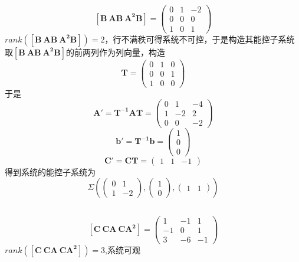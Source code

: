 \documentclass[UTF8,a4paper]{ctexart}
\begin{document}
\subsection{}
$$\mathbf{[B \ AB \ A^2B]}=\begin{pmatrix}
0&1&-2\\
0&0&0\\
1&0&1
\end{pmatrix}$$
$rank(\mathbf{[B\  AB\  A^2B]})=2$，行不满秩可得系统不可控，于是构造其能控子系统
取$\mathbf{[B \ AB \ A^2B]}$的前两列作为列向量，构造$$\mathbf{T}=\begin{pmatrix}
0&1&0\\
0&0&1\\
1&0&0\end{pmatrix}$$
于是$$\mathbf{A'=T^{-1}AT}=\begin{pmatrix}
0&1&-4\\
1&-2&2\\
0&0&-2\end{pmatrix}$$
$$\mathbf{b'=T^{-1}b}=\begin{pmatrix}1\\0\\0\end{pmatrix}$$
$$\mathbf{C'=CT}=\begin{pmatrix}1&1&-1\end{pmatrix}$$
得到系统的能控子系统为
$$\Sigma(\begin{pmatrix}
0&1\\
1&-2\end{pmatrix},
\begin{pmatrix}1\\0\end{pmatrix},
\begin{pmatrix}1&1\end{pmatrix})$$
\subsection{}
$$\mathbf{[C \ CA \ CA^2]}=\begin{pmatrix}
1&-1&1\\
-1&0&1\\
3&-6&-1
\end{pmatrix}$$
$rank(\mathbf{[C \ CA \ CA^2]})=3$,系统可观
\end{document}
